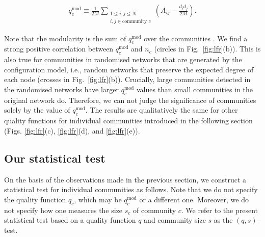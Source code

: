 \documentclass[fleqn,10pt]{wlscirep}
\def\qmod{q^{\text{mod}}}
\begin{document}
\begin{linenomath}
\begin{align}
    \label{eq:qmod}
     \qmod_c\equiv \frac{1}{2M}\sum_{\substack{1 \leq i,j \leq N\\ i,j \in \text{community $c$}}} \left( A_{ij} - \frac{d_id_j}{2M}\right).
\end{align}
\end{linenomath}
Note that the modularity is the sum of $\qmod_c$ over the communities \cite{Newman2006}.
We find a strong positive correlation between $\qmod_c$ and $n_c$ (circles in Fig.~\ref{fig:lfr}(b)). 
This is also true for communities in randomised networks that are generated by the configuration model, i.e., random networks that preserve the expected degree of each node (crosses in Fig.~\ref{fig:lfr}(b)).
Crucially, large communities detected in the randomised networks have larger $\qmod_c$ values than small communities in the original network do. 
Therefore, we can not judge the significance of communities solely by the value of $\qmod_c$.
The results are qualitatively the same for other quality functions for individual communities introduced in the following section (Figs. \ref{fig:lfr}(c), \ref{fig:lfr}(d), and \ref{fig:lfr}(e)).

\subsection{Our statistical test}
On the basis of the observations made in the previous section, we construct a statistical test for individual communities as follows.
Note that we do not specify the quality function $q_c$, which may be $\qmod_c$ or a different one.
Moreover, we do not specify how one measures the size  $s_c$ of community $c$. 
We refer to the present statistical test based on a quality function $q$ and community size $s$ as the $(q, s)$--test. 
\end{document}
